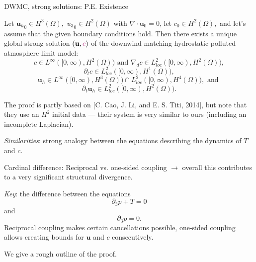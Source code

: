 \documentclass{beamer}
\begin{document}
\begin{frame}{DWMC, strong solutions: P.E. Existence}
\vspace{-0.5cm}
\begin{theorem}
Let ${\mathbf{u}_h}_0 \in H^3(\Omega),$ ${u_3}_0 \in H^2(\Omega)$ with $\nabla \cdot \mathbf{u}_0 = 0$, let $c_0 \in H^2 (\Omega),$ and let's assume that the given boundary conditions hold. Then there exists a unique global strong solution $(\mathbf{u}, \textcolor{mediumred-violet}{c})$ of the downwind-matching hydrostatic polluted atmosphere limit model:
%
    \begin{equation} \nonumber
      c \in L^\infty([0, \infty), H^2(\Omega)) \text{ and } \nabla_d c \in L^2_{loc}([0, \infty), H^2(\Omega)),
    \end{equation}
%
    \begin{equation} \nonumber
      \partial_t c \in L^2_{loc}([0, \infty), H^1(\Omega)),
    \end{equation}
%
    \begin{equation} \nonumber
      \mathbf{u}_h \in L^\infty([0, \infty), H^3(\Omega)) \cap L^2_{loc}([0, \infty), H^4(\Omega)), \text{ and }
    \end{equation}
%
    \begin{equation} \nonumber
      \partial_t \mathbf{u}_h \in L^2_{loc}([0, \infty), H^2(\Omega)).
    \end{equation}
%
\end{theorem}
\end{frame}

\begin{frame}
The proof is partly based on [C. Cao, J. Li, and E. S. Titi, 2014], but note that they use an $H^2$ initial data --- their system is very similar to ours (including an incomplete Laplacian).

\textit{Similarities}: strong analogy between the equations describing the dynamics of $T$ and $c$.

\textcolor{mediumred-violet}{Cardinal difference}: Reciprocal vs. one-sided coupling $\to$ overall this contributes to a very significant structural divergence.

\textit{Key}: the difference between the equations $$ \partial_3 p + T = 0$$ and $$ \partial_3 p = 0.$$ Reciprocal coupling makes certain cancellations possible, one-sided coupling allows creating bounds for $\mathbf{u}$ and $c$ consecutively.

\hspace{0.3cm} We give a rough outline of the proof.
\end{frame}
\end{document}
